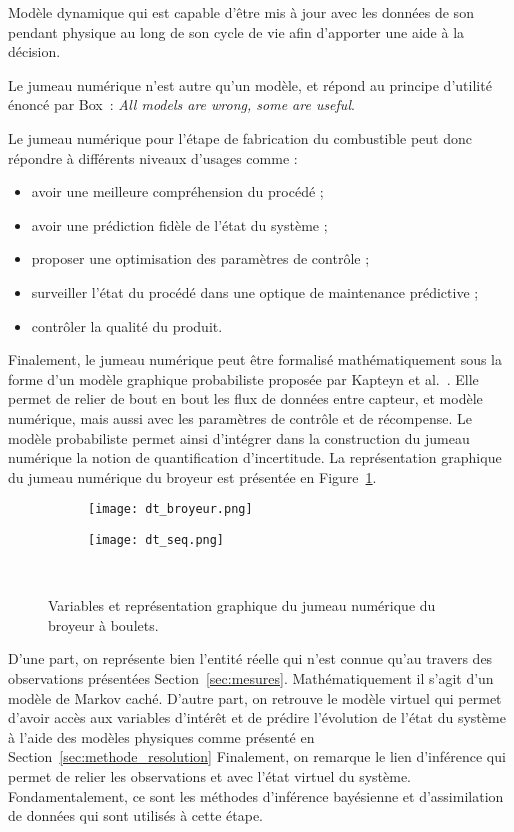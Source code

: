 \begin{definition}
    Modèle dynamique qui est capable d'être mis à jour avec les données de son pendant physique au long de son cycle de vie afin d'apporter une aide à la décision.
\end{definition}

Le jumeau numérique n'est autre qu'un modèle, et répond au principe d'utilité énoncé par Box~\cite{box1979}: \textit{All models are wrong, some are useful}.

Le jumeau numérique pour l'étape de fabrication du combustible peut donc répondre à différents niveaux d'usages comme :
\begin{itemize}
    \item avoir une meilleure compréhension du procédé ;
    \item avoir une prédiction fidèle de l'état du système ;
    \item proposer une optimisation des paramètres de contrôle ;
    \item surveiller l'état du procédé dans une optique de maintenance prédictive ;
    \item contrôler la qualité du produit.
\end{itemize}

Finalement, le jumeau numérique peut être formalisé mathématiquement sous la forme d'un modèle graphique probabiliste proposée par Kapteyn et al.~\cite{kapteyn_probabilistic_2021}.
Elle permet de relier de bout en bout les flux de données entre capteur, et modèle numérique, mais aussi avec les paramètres de contrôle et de récompense. Le modèle probabiliste permet ainsi d'intégrer dans la construction du jumeau numérique la notion de quantification d'incertitude. La représentation graphique du jumeau numérique du broyeur est présentée en Figure~\ref{fig:graph_dt}.

\begin{figure}[h]
    \centering
    \begin{subfigure}{0.46\textwidth}
        \texttt{[image: dt\_broyeur.png]}
    \end{subfigure}
    \hfill
    \begin{subfigure}{0.53\textwidth}
        \texttt{[image: dt\_seq.png]}
    \end{subfigure}
    \caption{Variables et représentation graphique du jumeau numérique du broyeur à boulets.}~\label{fig:graph_dt}
\end{figure}

D'une part, on représente bien l'entité réelle qui n'est connue qu'au travers des observations présentées Section~\ref{sec:mesures}. Mathématiquement il s'agit d'un modèle de Markov caché. D'autre part, on retrouve le modèle virtuel qui permet d'avoir accès aux variables d'intérêt et de prédire l'évolution de l'état du système à l'aide des modèles physiques comme présenté en Section~\ref{sec:methode_resolution}
Finalement, on remarque le lien d'inférence qui permet de relier les observations et avec l'état virtuel du système. Fondamentalement, ce sont les méthodes d'inférence bayésienne et d'assimilation de données qui sont utilisés à cette étape.





